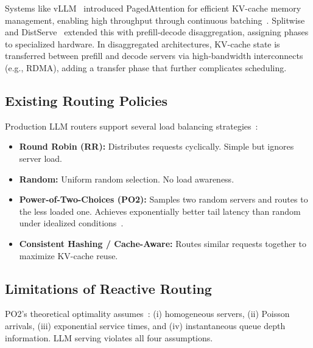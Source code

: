 \documentclass[runningheads]{llncs}
\begin{document}
Systems like vLLM~\cite{kwon2023vllm} introduced PagedAttention for efficient KV-cache memory management, enabling high throughput through continuous batching~\cite{yu2022orca}. Splitwise~\cite{patel2024splitwise} and DistServe~\cite{zhong2024distserve} extended this with prefill-decode disaggregation, assigning phases to specialized hardware. In disaggregated architectures, KV-cache state is transferred between prefill and decode servers via high-bandwidth interconnects (e.g., RDMA), adding a transfer phase that further complicates scheduling.

\subsection{Existing Routing Policies}

Production LLM routers support several load balancing strategies~\cite{vllmrouter2025}:

\begin{itemize}
    \item \textbf{Round Robin (RR):} Distributes requests cyclically. Simple but ignores server load.
    \item \textbf{Random:} Uniform random selection. No load awareness.
    \item \textbf{Power-of-Two-Choices (PO2):} Samples two random servers and routes to the less loaded one. Achieves exponentially better tail latency than random under idealized conditions~\cite{mitzenmacher2001power}.
    \item \textbf{Consistent Hashing / Cache-Aware:} Routes similar requests together to maximize KV-cache reuse.
\end{itemize}

\subsection{Limitations of Reactive Routing}

PO2's theoretical optimality assumes~\cite{mitzenmacher2001power}: (i) homogeneous servers, (ii) Poisson arrivals, (iii) exponential service times, and (iv) instantaneous queue depth information. LLM serving violates all four assumptions.
\end{document}
